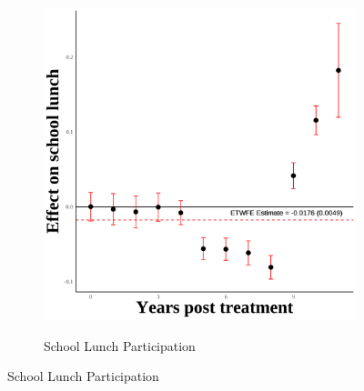 \documentclass[12pt,english]{article}
\begin{document}
\begin{figure}[H]
\begin{subfigure}[b]{0.3\textwidth}
    \label{fig:ln-schl-lunch-secgen-wh}
  \end{subfigure}
  \hfill
  \begin{subfigure}[b]{0.3\textwidth}
    \centering
    \caption{School Lunch Participation}
    \includegraphics[width=\linewidth]{figures/plot43-schl_lunch_event_study-secgen-wh.png}
    \label{fig:schl-lunch-secgen-wh}
  \end{subfigure}

  \vspace{0.3cm} %


\end{figure}
\end{document}
